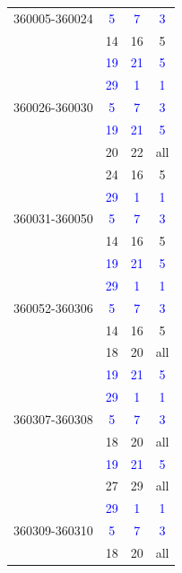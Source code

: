 \documentclass[a4paper,10pt]{article}
\begin{document}
\begin{table}[h]
\begin{center}
\begin{tabular}{|c||c|c|c|}
360005-360024 & \textcolor{blue}{5} & \textcolor{blue}{7} & \textcolor{blue}{3} \\
              & 14 & 16 & 5 \\
              & \textcolor{blue}{19} & \textcolor{blue}{21}  & \textcolor{blue}{5} \\
              & \textcolor{blue}{29} & \textcolor{blue}{1}  & \textcolor{blue}{1} \\\hline
360026-360030 & \textcolor{blue}{5} & \textcolor{blue}{7} & \textcolor{blue}{3}\\
              & \textcolor{blue}{19} & \textcolor{blue}{21}  & \textcolor{blue}{5} \\
              & 20 & 22 & all \\
              & 24 & 16 & 5\\
              & \textcolor{blue}{29} & \textcolor{blue}{1}  & \textcolor{blue}{1} \\\hline
360031-360050 & \textcolor{blue}{5} & \textcolor{blue}{7} & \textcolor{blue}{3}\\
              & 14 & 16 & 5\\
              & \textcolor{blue}{19} & \textcolor{blue}{21}  & \textcolor{blue}{5}\\
              & \textcolor{blue}{29} & \textcolor{blue}{1}  & \textcolor{blue}{1} \\\hline
360052-360306 & \textcolor{blue}{5} & \textcolor{blue}{7} & \textcolor{blue}{3}\\
              & 14 & 16 & 5\\
              & 18 & 20 & all\\
              & \textcolor{blue}{19} & \textcolor{blue}{21} & \textcolor{blue}{5} \\
              & \textcolor{blue}{29} & \textcolor{blue}{1}  & \textcolor{blue}{1} \\\hline
360307-360308 & \textcolor{blue}{5} & \textcolor{blue}{7} & \textcolor{blue}{3}\\
              & 18 & 20 & all\\
              & \textcolor{blue}{19} & \textcolor{blue}{21}  & \textcolor{blue}{5} \\
              & 27 & 29 & all\\
              & \textcolor{blue}{29} & \textcolor{blue}{1}  & \textcolor{blue}{1} \\\hline
360309-360310 & \textcolor{blue}{5} & \textcolor{blue}{7} & \textcolor{blue}{3}\\
              & 18 & 20 & all\\

\end{tabular}
\end{center}
\end{table}
\end{document}
